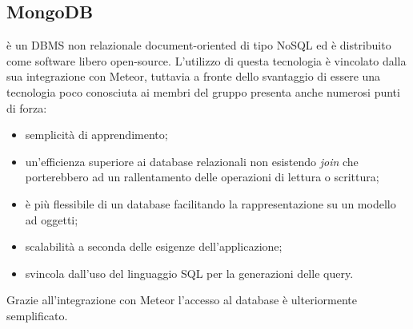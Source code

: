 \subsection{MongoDB}
 è un DBMS non relazionale document-oriented di tipo NoSQL ed è distribuito come software libero open-source. L'utilizzo di questa tecnologia è vincolato dalla sua integrazione con Meteor, tuttavia a fronte dello svantaggio di essere una tecnologia poco conosciuta ai membri del gruppo presenta anche numerosi punti di forza:
\begin{itemize}
	\item semplicità di apprendimento;
	\item un'efficienza superiore ai database relazionali non esistendo \textit{join} che porterebbero ad un rallentamento delle operazioni di lettura o scrittura; 
	\item è più flessibile di un database  facilitando la rappresentazione su un modello ad oggetti;
	\item scalabilità a seconda delle esigenze dell'applicazione;
	\item svincola dall'uso del linguaggio SQL per la generazioni delle query.
\end{itemize}
Grazie all'integrazione con Meteor l'accesso al database è ulteriormente semplificato.

